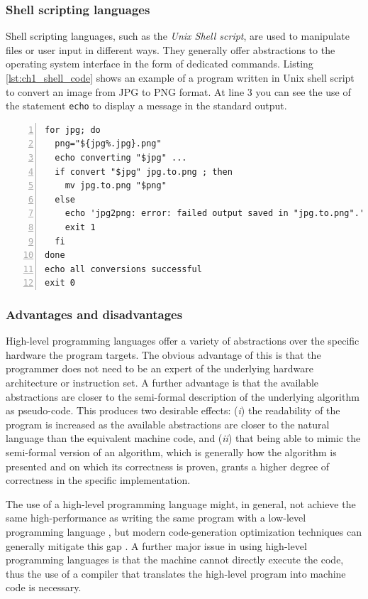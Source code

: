 \subsubsection*{Shell scripting languages}
Shell scripting languages, such as the \textit{Unix Shell script}, are used to manipulate files or user input in different ways. They generally offer abstractions to the operating system interface in the form of dedicated commands. Listing \ref{lst:ch1_shell_code} shows an example of a program written in Unix shell script to convert an image from JPG to PNG format. At line 3 you can see the use of the statement \texttt{echo} to display a message in the standard output.

\begin{lstlisting}[numbers = left, caption = Unix shell code, label = lst:ch1_shell_code]
for jpg; do                                  
  png="${jpg%.jpg}.png"                    
  echo converting "$jpg" ...               
  if convert "$jpg" jpg.to.png ; then      
    mv jpg.to.png "$png"                 
  else                                     
    echo 'jpg2png: error: failed output saved in "jpg.to.png".' >&2
    exit 1
  fi                                       
done                                         
echo all conversions successful              
exit 0
\end{lstlisting}

\subsubsection*{Advantages and disadvantages}
High-level programming languages offer a variety of abstractions over the specific hardware the program targets. The obvious advantage of this is that the programmer does not need to be an expert of the underlying hardware architecture or instruction set. A further advantage is that the available abstractions are closer to the semi-formal description of the underlying algorithm as pseudo-code. This produces two desirable effects: (\textit{i}) the readability of the program is increased as the available abstractions are closer to the natural language than the equivalent machine code, and (\textit{ii}) that being able to mimic the semi-formal version of an algorithm, which is generally how the algorithm is presented and on which its correctness is proven, grants a higher degree of correctness in the specific implementation.

The use of a high-level programming language might, in general, not achieve the same high-performance as writing the same program with a low-level programming language  \cite{chatzigeorgiou2002evaluating}, but modern code-generation optimization techniques can generally mitigate this gap \cite{amarasinghe1993communication, wang2007code}. A further major issue in using high-level programming languages is that the machine cannot directly execute the code, thus the use of a compiler that translates the high-level program into machine code is necessary.

